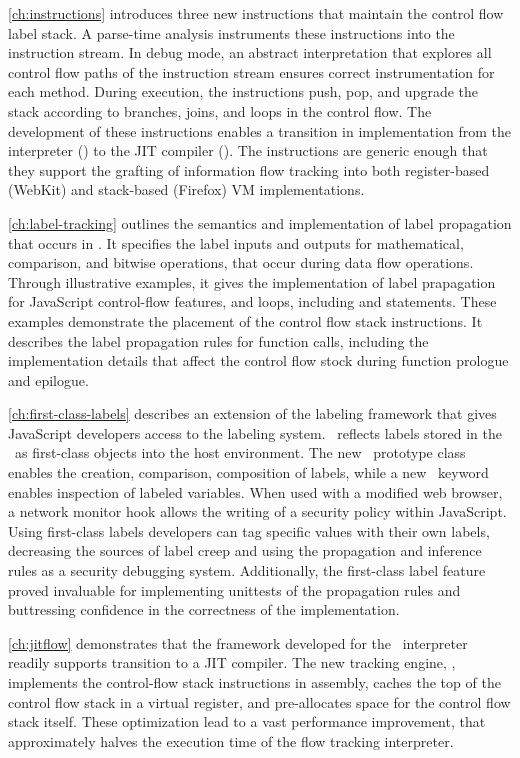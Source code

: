 \autoref{ch:instructions} introduces three new instructions that maintain the control flow label stack.
A parse-time analysis instruments these instructions into the instruction stream.
In debug mode, an abstract interpretation that explores all control flow paths of the instruction stream ensures correct instrumentation for each method.
During execution, the instructions push, pop, and upgrade the stack according to branches, joins, and loops in the control flow.
The development of these instructions enables a transition in implementation from the interpreter (\FlowCore) to the JIT compiler (\JitFlow).
The instructions are generic enough that they support the grafting of information flow tracking into both register-based (WebKit) and stack-based (Firefox) VM implementations.

\autoref{ch:label-tracking} outlines the semantics and implementation of label propagation that occurs in \FlowCore.
It specifies the label inputs and outputs for mathematical, comparison, and bitwise operations, that occur during data flow operations.
Through illustrative examples, it gives the implementation of label prapagation for JavaScript control-flow features,  and  loops, including  and  statements.
These examples demonstrate the placement of the control flow stack instructions.
It describes the label propagation rules for function calls, including the implementation details that affect the control flow stock during function prologue and epilogue.

\autoref{ch:first-class-labels} describes an extension of the labeling framework that gives JavaScript developers access to the labeling system.
\FlowCore\ reflects labels stored in the \FlowLabelRegistry\ as first-class objects into the host environment.
The new \FlowLabelObject\ prototype class enables the creation, comparison, composition of labels, while a new \mlabelof\ keyword enables inspection of labeled variables.
When used with a modified web browser, a network monitor hook allows the writing of a security policy within JavaScript.
Using first-class labels developers can tag specific values with their own labels, decreasing the sources of label creep and using the propagation and inference rules as a security debugging system.
Additionally, the first-class label feature proved invaluable for implementing unittests of the propagation rules and buttressing confidence in the correctness of the implementation.

\autoref{ch:jitflow} demonstrates that the framework developed for the \FlowCore\ interpreter readily supports transition to a JIT compiler.
The new tracking engine, \JitFlow, implements the control-flow stack instructions in assembly, caches the top of the control flow stack in a virtual register, and pre-allocates space for the control flow stack itself.
These optimization lead to a vast performance improvement, that approximately halves the execution time of the flow tracking interpreter.
